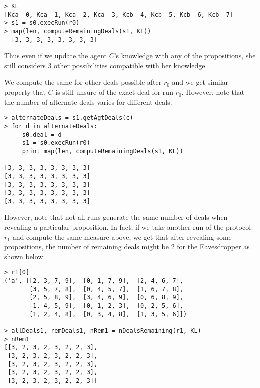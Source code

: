 \documentclass{article}
\begin{document}
\begin{verbatim}
> KL
[Kca__0, Kca__1, Kca__2, Kca__3, Kcb__4, Kcb__5, Kcb__6, Kcb__7]
> s1 = s0.execRun(r0)
> map(len, computeRemainingDeals(s1, KL))
  [3, 3, 3, 3, 3, 3, 3, 3]
\end{verbatim}

Thus even if we update the agent $C$'s knowledge with any
of the propositions, she still considers $3$ other possibilities
compatible with her knowledge.

We compute the same for other deals possible after $r_0$ and
we get similar property that $C$ is still unsure of the exact
deal for run $r_0$. However, note that the number of alternate
deals varies for different deals.

\begin{verbatim}
> alternateDeals = s1.getAgtDeals(c)
> for d in alternateDeals:
     s0.deal = d
     s1 = s0.execRun(r0)
     print map(len, computeRemainingDeals(s1, KL))

[3, 3, 3, 3, 3, 3, 3, 3]
[3, 3, 3, 3, 3, 3, 3, 3]
[3, 3, 3, 3, 3, 3, 3, 3]
[3, 3, 3, 3, 3, 3, 3, 3]
[3, 3, 3, 3, 3, 3, 3, 3]
\end{verbatim}

However, note that not all runs generate the same number of
deals when revealing a particular proposition. In fact,
if we take another run of the protocol $r_1$ and compute
the same measure above, we get that after revealing some
propositions, the number of remaining deals might be $2$
for the Eavesdropper as shown below.

\begin{verbatim}
> r1[0]
('a', [[2, 3, 7, 9],  [0, 1, 7, 9],  [2, 4, 6, 7],  
       [3, 5, 7, 8],  [0, 4, 5, 7],  [1, 6, 7, 8],  
       [2, 5, 8, 9],  [3, 4, 6, 9],  [0, 6, 8, 9],  
       [1, 4, 5, 9],  [0, 1, 2, 3],  [0, 2, 5, 6],
       [1, 2, 4, 8],  [0, 3, 4, 8],  [1, 3, 5, 6]])

> allDeals1, remDeals1, nRem1 = nDealsRemaining(r1, KL)
> nRem1
[[3, 2, 3, 2, 3, 2, 2, 3],
 [3, 2, 3, 2, 3, 2, 2, 3],
 [3, 2, 3, 2, 3, 2, 2, 3],
 [3, 2, 3, 2, 3, 2, 2, 3],
 [3, 2, 3, 2, 3, 2, 2, 3]]
\end{verbatim}

\end{document}
